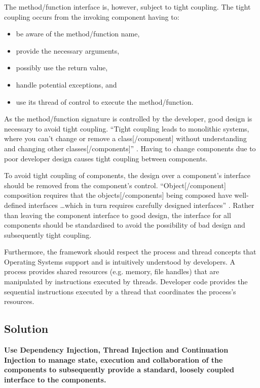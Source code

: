 \documentclass[prodmode]{style/acmlarge}
\begin{document}
The method/function interface is, however, subject to tight coupling.  The tight
coupling occurs from the invoking component having to:
\begin{itemize}
  \item be aware of the method/function name,
  \item provide the necessary arguments,
  \item possibly use the return value,
  \item handle potential exceptions, and
  \item use its thread of control to execute the method/function.
\end{itemize}

As the method/function signature is controlled by the developer, good design is
necessary to avoid tight coupling.  ``Tight coupling leads to monolithic
systems, where you can't change or remove a class[/component] without
understanding and changing other classes[/components]'' \cite[p. 24-25]{gof}.
Having to change components due to poor developer design causes tight coupling
between components.

To avoid tight coupling of components, the design over a component's
interface should be removed from the component's control. ``Object[/component]
composition requires that the objects[/components] being composed have
well-defined interfaces \ldots which in turn requires carefully designed
interfaces'' \cite[p. 19]{gof}.  Rather than leaving the component interface to
good design, the interface for all components should be standardised to avoid
the possibility of bad design and subsequently tight coupling.

Furthermore, the framework should respect the process and thread concepts that
Operating Systems support and is intuitively understood by developers.  A
process provides shared resources (e.g. memory, file handles) that are
manipulated by instructions executed by threads.  Developer code provides the
sequential instructions executed by a thread that coordinates the process's
resources.


\subsection{Solution}

\textbf{Use Dependency Injection, Thread Injection and Continuation Injection to manage state, execution and collaboration of the components to subsequently provide a standard, loosely coupled interface to the components.}
\end{document}
